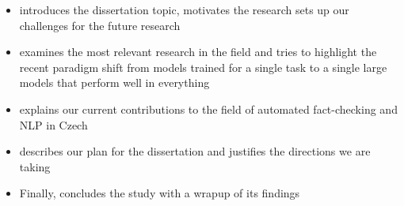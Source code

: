 \begin{itemize}
\item {} introduces the dissertation topic, motivates the research sets up our challenges for the future research 

\item {} examines the most relevant research in the field and tries to highlight the recent paradigm shift from models trained for a single task to a single large models that perform well in everything

\item {} explains our current contributions to the field of automated fact-checking and NLP in Czech

\item {} describes our plan for the dissertation and justifies the directions we are taking

\item Finally, {} concludes the study with a wrapup of its findings

\end{itemize}

